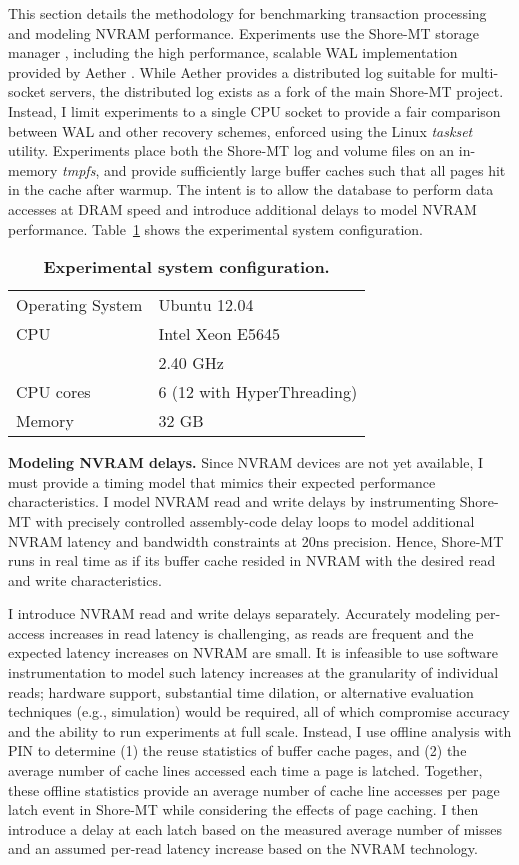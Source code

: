 This section details the methodology for benchmarking transaction processing and modeling NVRAM performance.
Experiments use the Shore-MT storage manager \cite{JohnsonPandis09}, including the high performance, scalable WAL implementation provided by Aether \cite{JohnsonPandis10}.
While Aether provides a distributed log suitable for multi-socket servers, the distributed log exists as a fork of the main Shore-MT project.
Instead, I limit experiments to a single CPU socket to provide a fair comparison between WAL and other recovery schemes, enforced using the Linux \emph{taskset} utility.
Experiments place both the Shore-MT log and volume files on an in-memory \emph{tmpfs}, and provide sufficiently large buffer caches such that all pages hit in the cache after warmup.
The intent is to allow the database to perform data accesses at DRAM speed and introduce additional delays to model NVRAM performance.
Table~\ref{table::Specs} shows the experimental system configuration.

\begin{table}
  \centering
  \begin{tabular}{l l}
    \hline
    Operating System & Ubuntu 12.04 \\
    CPU & Intel Xeon E5645 \\
    & 2.40 GHz \\
    CPU cores & 6 (12 with HyperThreading) \\
    Memory & 32 GB \\
    \hline
  \end{tabular}
  \caption{\textbf{Experimental system configuration.}}
  \label{table::Specs}
\end{table}

\textbf{Modeling NVRAM delays.}
Since NVRAM devices are not yet available, I must provide a timing model that mimics their expected performance characteristics.
I model NVRAM read and write delays by instrumenting Shore-MT with precisely controlled assembly-code delay loops to model additional NVRAM latency and bandwidth constraints at 20ns precision.
Hence, Shore-MT runs in real time as if its buffer cache resided in NVRAM with the desired read and write characteristics.

I introduce NVRAM read and write delays separately.
Accurately modeling per-access increases in read latency is challenging, as reads are frequent and the expected latency increases on NVRAM are small.
It is infeasible to use software instrumentation to model such latency increases at the granularity of individual reads; hardware support, substantial time dilation, or alternative evaluation techniques (e.g., simulation) would be required, all of which compromise accuracy and the ability to run experiments at full scale.
Instead, I use offline analysis with PIN \cite{LukCohn05} to determine (1) the reuse statistics of buffer cache pages, and (2) the average number of cache lines accessed each time a page is latched.
Together, these offline statistics provide an average number of cache line accesses per page latch event in Shore-MT while considering the effects of page caching.
I then introduce a delay at each latch based on the measured average number of misses and an assumed per-read latency increase based on the NVRAM technology.

